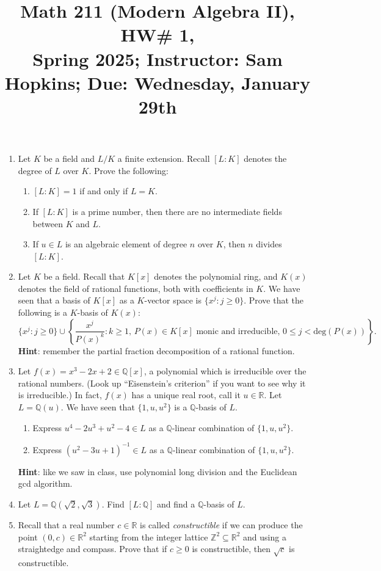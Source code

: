 \documentclass[11pt]{article}
\title{Math 211 (Modern Algebra II), HW\# 1, \\ {\normalsize Spring 2025; Instructor: Sam Hopkins; Due: Wednesday, January 29th}}
\date{}
\begin{document}
\maketitle

\thispagestyle{empty}

\begin{enumerate}

\item Let $K$ be a field and $L/K$ a finite extension. Recall $[L:K]$ denotes the degree of $L$ over $K$. Prove the following:
\begin{enumerate}
\item $[L:K]=1$ if and only if $L=K$.
\item If $[L:K]$ is a prime number, then there are no intermediate fields between $K$ and $L$.
\item If $u \in L$ is an algebraic element of degree $n$ over $K$, then $n$ divides $[L:K]$.
\end{enumerate}

\item Let $K$ be a field. Recall that $K[x]$ denotes the polynomial ring, and $K(x)$ denotes the field of rational functions, both with coefficients in $K$. We have seen that a basis of $K[x]$ as a $K$-vector space is $\{x^j\colon j \geq 0\}$. Prove that the following is a $K$-basis of $K(x)$:
\[ \{ x^j\colon j\geq 0\} \cup\left \{\frac{x^j}{P(x)^k}\colon k \geq 1, \, P(x) \in K[x] \textrm{ monic and irreducible}, \, 0 \leq j < \mathrm{deg}(P(x)) \right \} .\]
{\bf Hint}: remember the partial fraction decomposition of a rational function.

\item Let $f(x)=x^3-2x+2 \in \mathbb{Q}[x]$, a polynomial which is irreducible over the rational numbers. (Look up ``Eisenstein's criterion'' if you want to see why it is irreducible.) In fact, $f(x)$ has a unique real root, call it $u \in \mathbb{R}$. Let $L=\mathbb{Q}(u)$. We have seen that $\{1,u,u^2\}$ is a $\mathbb{Q}$-basis of $L$.
\begin{enumerate}
\item Express $u^4-2u^3+u^2-4 \in L$ as a $\mathbb{Q}$-linear combination of $\{1,u,u^2\}$.
\item Express $(u^2-3u+1)^{-1} \in L$ as a $\mathbb{Q}$-linear combination of $\{1,u,u^2\}$.
\end{enumerate}
{\bf Hint}: like we saw in class, use polynomial long division and the Euclidean gcd algorithm.

\item Let $L=\mathbb{Q}(\sqrt{2},\sqrt{3})$. Find $[L:\mathbb{Q}]$ and find a $\mathbb{Q}$-basis of $L$.

\item Recall that a real number $c \in \mathbb{R}$ is called \emph{constructible} if we can produce the point $(0,c) \in \mathbb{R}^2$ starting from the integer lattice $\mathbb{Z}^2 \subseteq \mathbb{R}^2$ and using a straightedge and compass. Prove that if $c \geq 0$ is constructible, then $\sqrt{c}$ is constructible.

\end{enumerate}
\end{document}
